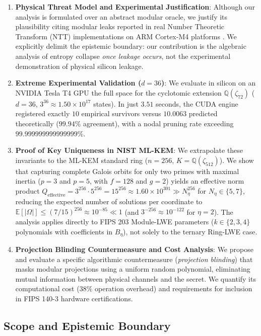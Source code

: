 \documentclass[11pt,a4paper]{article}
\theoremstyle{plain}
\theoremstyle{definition}
\numberwithin{equation}{section}
\newcommand{\QQ}{\mathbb{Q}}
\newcommand{\E}{\mathbb{E}}
\begin{document}
\begin{enumerate}
    \item \textbf{Physical Threat Model and Experimental Justification}: Although our analysis is formulated over an abstract modular oracle, we justify its plausibility citing modular leaks reported in real Number Theoretic Transform (NTT) implementations on ARM Cortex-M4 platforms \cite{Ravi2020,Wenger2024}. We explicitly delimit the epistemic boundary: our contribution is the algebraic analysis of entropy collapse \emph{once leakage occurs}, not the experimental demonstration of physical silicon leakage.
    
    \item \textbf{Extreme Experimental Validation ($d=36$)}: We evaluate in silicon on an NVIDIA Tesla T4 GPU the full space for the cyclotomic extension $\QQ(\zeta_{72})$ ($d=36$, $3^{36} \approx 1.50 \times 10^{17}$ states). In just $3.51$ seconds, the CUDA engine registered exactly $10$ empirical survivors versus $10.0063$ predicted theoretically ($99.94\%$ agreement), with a nodal pruning rate exceeding $99.999999999999999\%$.
    
    \item \textbf{Proof of Key Uniqueness in NIST ML-KEM}: We extrapolate these invariants to the ML-KEM standard ring ($n=256$, $K = \QQ(\zeta_{512})$). We show that capturing complete Galois orbits for only two primes with maximal inertia ($p=3$ and $p=5$, with $f=128$ and $g=2$) yields an effective norm product $Q_{\text{effective}} = 3^{256} \cdot 5^{256} = 15^{256} \approx 1.60 \times 10^{301} \gg N_\eta^{256}$ for $N_\eta \in \{5, 7\}$, reducing the expected number of solutions per coordinate to $\E[|\Omega|] \le (7/15)^{256} \approx 10^{-85} \ll 1$ (and $3^{-256} \approx 10^{-122}$ for $\eta = 2$). The analysis applies directly to FIPS 203 Module-LWE parameters ($k \in \{2, 3, 4\}$ polynomials with coefficients in $B_\eta$), not solely to the ternary Ring-LWE case.

    \item \textbf{Projection Blinding Countermeasure and Cost Analysis}: We propose and evaluate a specific algorithmic countermeasure (\emph{projection blinding}) that masks modular projections using a uniform random polynomial, eliminating mutual information between physical channels and the secret. We quantify its computational cost ($38\%$ operation overhead) and requirements for inclusion in FIPS 140-3 hardware certifications.
\end{enumerate}

\subsection{Scope and Epistemic Boundary}
\label{subsec:frontera_epistemica}
\end{document}
